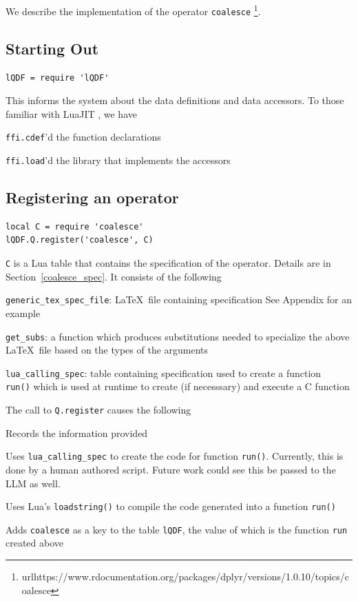 \documentclass[letterpaper,12pt]{article}
\begin{document}
{We describe the implementation of the operator {\tt coalesce}
\footnote{url{https://www.rdocumentation.org/packages/dplyr/versions/1.0.10/topics/coalesce}}.

\subsection{Starting Out}
\begin{verbatim}
lQDF = require 'lQDF'
\end{verbatim}
This informs the system about the data definitions and data accessors.
To those familiar with LuaJIT \cite{LuaJIT}, we have
\be
\item {\tt ffi.cdef}'d the function declarations
\item {\tt ffi.load}'d the library that implements the accessors
  \ee

  \subsection{Registering an operator}
\begin{verbatim}
local C = require 'coalesce'
lQDF.Q.register('coalesce', C)
\end{verbatim}

{\tt C} is a Lua table that contains the specification of the operator. 
Details are in Section~\ref{coalesce_spec}. It consists of the following
\be
\item \verb+generic_tex_spec_file+: \LaTeX\ file containing specification 
  See Appendix for an example %
\item \verb+get_subs+: a function which produces substitutions needed
  to specialize the above \LaTeX\ file based on the types of the arguments
\item \verb+lua_calling_spec+: table containing specification used to 
  create a function {\tt
  run()} which is used at runtime to create (if necesssary) 
  and execute a C function
  \ee

The call to {\tt Q.register} causes the following
\be
\item Records the information provided
\item Uses \verb+lua_calling_spec+ to create the code for function {\tt run()}.
  Currently, this is done by a human authored script. Future work could see this
  be passed to the LLM as well. 
\item Uses Lua's {\tt loadstring()} to compile the code generated into a
  function {\tt run()}
\item Adds {\tt coalesce} as a key to the table {\tt lQDF}, the value of which
  is the function {\tt run} created above
  \ee

}
\end{document}
